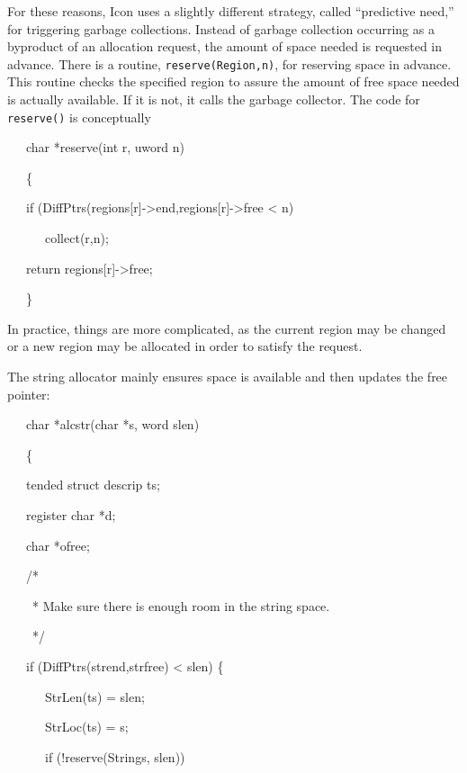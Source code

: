 For these reasons, Icon uses a slightly different strategy, called
``predictive need,'' for triggering garbage collections. Instead of
garbage collection occurring as a byproduct of an allocation request,
the amount of space needed is requested in advance. There is a
routine, \texttt{reserve(Region,n)}, for reserving space in
advance. This routine checks the specified region to assure the amount
of free space needed is actually available. If it is not, it calls the
garbage collector. The code for \texttt{reserve()} is conceptually

{\ttfamily\mdseries
\ \ \ char *reserve(int r, uword n)}

{\ttfamily\mdseries
\ \ \ \{}

{\ttfamily\mdseries
\ \ \ if (DiffPtrs(regions[r]-{\textgreater}end,regions[r]-{\textgreater}free {\textless} n)}

{\ttfamily\mdseries
\ \ \ \ \ \ collect(r,n);}

{\ttfamily\mdseries
\ \ \ return regions[r]-{\textgreater}free;}

{\ttfamily\mdseries
\ \ \ \}}


In practice, things are more complicated, as the current region may be
changed or a new region may be allocated in order to satisfy the
request.


The string allocator mainly ensures space is available and then
updates the free pointer:

{\ttfamily\mdseries
\ \ \ char *alcstr(char *s, word slen)}

{\ttfamily\mdseries
\ \ \ \{}

{\ttfamily\mdseries
\ \ \ tended struct descrip ts;
}

{\ttfamily\mdseries
\ \ \ register char *d;
}

{\ttfamily\mdseries
\ \ \ char *ofree;
}


\bigskip

{\ttfamily\mdseries
\ \ \ /*
}

{\ttfamily\mdseries
\ \ \ \ * Make sure there is enough room in the string space.}

{\ttfamily\mdseries
\ \ \ \ */
}

{\ttfamily\mdseries
\ \ \ if (DiffPtrs(strend,strfree) {\textless} slen) \{
}

{\ttfamily\mdseries
\ \ \ \ \ \ StrLen(ts) = slen;
}

{\ttfamily\mdseries
\ \ \ \ \ \ StrLoc(ts) = s;
}

{\ttfamily\mdseries
\ \ \ \ \ \ if (!reserve(Strings, slen))
}

